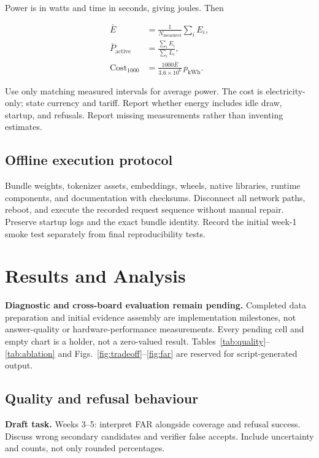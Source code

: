 \documentclass[conference]{IEEEtran}
\newcommand{\draftnote}[1]{%
\par\smallskip\noindent
\colorbox{pale}{%
\parbox{\dimexpr\columnwidth-2\fboxsep\relax}{%
\small\textbf{Draft task.} #1}}%
\par\smallskip}
\begin{document}
Power is in watts and time in seconds, giving joules. Then

\begin{align}
\bar E &=
\frac{1}{N_{\mathrm{measured}}}\sum_i E_i,\\
\bar P_{\mathrm{active}} &=
\frac{\sum_i E_i}{\sum_i L_i},\\
\mathrm{Cost}_{1000} &=
\frac{1000\bar E}{3.6\times10^6}\,p_{\mathrm{kWh}}.
\end{align}

Use only matching measured intervals for average power.
The cost is electricity-only; state currency and tariff.
Report whether energy includes idle draw, startup, and refusals.
Report missing measurements rather than inventing estimates.

\subsection{Offline execution protocol}

Bundle weights, tokenizer assets, embeddings, wheels,
native libraries, runtime components, and documentation
with checksums. Disconnect all network paths, reboot,
and execute the recorded request sequence without manual repair.
Preserve startup logs and the exact bundle identity.
Record the initial week-1 smoke test separately from final
reproducibility tests.

\section{Results and Analysis}

\textbf{Diagnostic and cross-board evaluation remain pending.}
Completed data preparation and initial evidence assembly are
implementation milestones, not answer-quality or
hardware-performance measurements. Every pending cell and empty
chart is a holder, not a zero-valued result.
Tables~\ref{tab:quality}--\ref{tab:ablation} and
Figs.~\ref{fig:tradeoff}--\ref{fig:far} are reserved for
script-generated output.

\subsection{Quality and refusal behaviour}



\draftnote{
Weeks 3--5: interpret FAR alongside coverage and refusal success.
Discuss wrong secondary candidates and verifier false accepts.
Include uncertainty and counts, not only rounded percentages.
}
\end{document}
